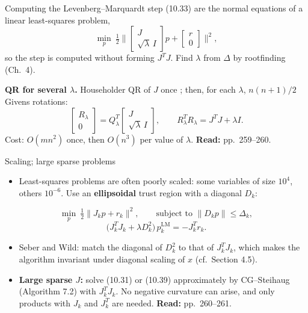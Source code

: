 \documentclass[aspectratio=169,12pt]{beamer}
\newcommand{\LM}{\mathrm{LM}}
\newcommand{\eqn}[1]{\text{\small(#1)}}
\newcommand{\readbook}[1]{{\color{red}\textbf{Read:} #1}}
\begin{document}
\begin{frame}{Computing the Levenberg--Marquardt step}
  (10.33) are the normal equations of a linear least-squares problem,
  \[ \min_{p}\ \tfrac12\Big\|\begin{bmatrix}J\\ \sqrt{\lambda}\,I\end{bmatrix}p+\begin{bmatrix}r\\0\end{bmatrix}\Big\|^{2}, \tag{10.35} \]
  so the step is computed without forming $J^{T}J$. Find $\lambda$ from $\Delta$ by rootfinding (Ch.~4).

  \vspace{0.2em}
  \textbf{QR for several $\lambda$.} Householder QR of $J$ once \eqn{10.37}; then, for each $\lambda$,
  $n(n+1)/2$ Givens rotations:
  \[ \begin{bmatrix}R_{\lambda}\\0\end{bmatrix}=Q_{\lambda}^{T}\begin{bmatrix}J\\ \sqrt{\lambda}\,I\end{bmatrix},\qquad R_{\lambda}^{T}R_{\lambda}=J^{T}J+\lambda I . \tag{10.36} \]
  Cost: $O(mn^{2})$ once, then $O(n^{3})$ per value of $\lambda$. \readbook{pp.~259--260.}
\end{frame}

\begin{frame}{Scaling; large sparse problems}
  \begin{itemize}\setlength\itemsep{0.5em}
    \item Least-squares problems are often poorly scaled: some variables of size $10^{4}$,
      others $10^{-6}$. Use an \textbf{ellipsoidal} trust region with a diagonal $D_{k}$:
  \end{itemize}
  \[ \min_{p}\ \tfrac12\|J_{k}p+r_{k}\|^{2},\qquad\text{subject to }\|D_{k}p\|\le\Delta_{k}, \tag{10.39} \]
  \[ \big(J_{k}^{T}J_{k}+\lambda D_{k}^{2}\big)\,p_{k}^{\LM}=-J_{k}^{T}r_{k} . \tag{10.40} \]
  \begin{itemize}\setlength\itemsep{0.5em}
    \item[] Seber and Wild: match the diagonal of $D_{k}^{2}$ to that of $J_{k}^{T}J_{k}$, which makes the
      algorithm invariant under diagonal scaling of $x$ (cf.\ Section 4.5).
    \item \textbf{Large sparse $J$:} solve (10.31) or (10.39) approximately by CG--Steihaug
      (Algorithm 7.2) with $J_{k}^{T}J_{k}$. No negative curvature can arise, and only products
      with $J_{k}$ and $J_{k}^{T}$ are needed. \readbook{pp.~260--261.}
  \end{itemize}
\end{frame}
\end{document}
